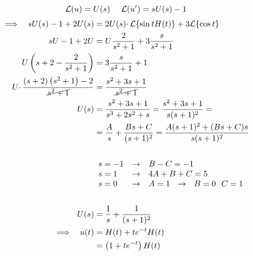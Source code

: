 \Soluzione
\begin{equation*}
\mathcal{L}( u) =U( s) \ \ \ \ \mathcal{L}( u') =sU( s) -1
\end{equation*}
\begin{align*}
\implies \ \ sU( s) -1+2U( s) & =2U( s) \cdotp \mathcal{L}\{\sin tH( t)\} +3\mathcal{L}\{\cos t\}\\
sU-1+2U & =U\frac{2}{s^{2} +1} +3\frac{s}{s^{2} +1}\\
U\left( s+2-\frac{2}{s^{2} +1}\right) & =3\frac{s}{s^{2} +1} +1\\
U\cdotp \frac{( s+2)\left( s^{2} +1\right) -2}{\cancel{s^{2} +1}} & =\frac{s^{2} +3s+1}{\cancel{s^{2} +1}}\\
U( s) & =\frac{s^{2} +3s+1}{s^{3} +2s^{2} +s} =\frac{s^{2} +3s+1}{s( s+1)^{2}} =\\
 & =\frac{A}{s} +\frac{Bs+C}{( s+1)^{2}} =\frac{A( s+1)^{2} +( Bs+C) s}{s( s+1)^{2}}\\
 & \\
 & \begin{array}{ l c l }
s=-1 & \rightarrow  & B-C=-1\\
s=1 & \rightarrow  & 4A+B+C=5\\
s=0 & \rightarrow  & A=1\ \ \rightarrow \ \ B=0\ \ C=1
\end{array}\\
 & \ \ \ \ \\
U( s) & =\frac{1}{s} +\frac{1}{( s+1)^{2}}\\
\implies \ \ u( t) & =H( t) +te^{-t} H( t)\\
 & =\left( 1+te^{-t}\right) H( t)
\end{align*}
\Soluzione

